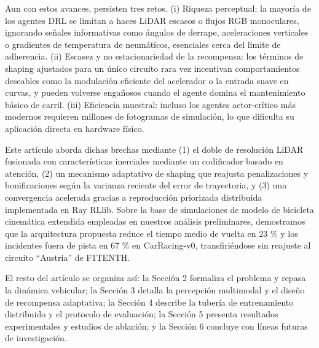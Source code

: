 Aun con estos avances, persisten tres retos. (i) Riqueza perceptual: la mayoría de los agentes DRL se limitan a haces LiDAR escasos o flujos RGB monoculares, ignorando señales informativas como ángulos de derrape, aceleraciones verticales o gradientes de temperatura de neumáticos, esenciales cerca del límite de adherencia. (ii) Escasez y no estacionariedad de la recompensa: los términos de shaping ajustados para un único circuito rara vez incentivan comportamientos deseables como la modulación eficiente del acelerador o la entrada suave en curvas, y pueden volverse engañosos cuando el agente domina el mantenimiento básico de carril. (iii) Eficiencia muestral: incluso los agentes actor-crítico más modernos requieren millones de fotogramas de simulación, lo que dificulta su aplicación directa en hardware físico.

Este artículo aborda dichas brechas mediante (1) el doble de resolución LiDAR fusionada con características inerciales mediante un codificador basado en atención, (2) un mecanismo adaptativo de shaping que reajusta penalizaciones y bonificaciones según la varianza reciente del error de trayectoria, y (3) una convergencia acelerada gracias a reproducción priorizada distribuida implementada en Ray RLlib. Sobre la base de simulaciones de modelo de bicicleta cinemática extendida empleadas en nuestros análisis preliminares, demostramos que la arquitectura propuesta reduce el tiempo medio de vuelta en 23 \% y los incidentes fuera de pista en 67 \% en CarRacing-v0, transfiriéndose sin reajuste al circuito “Austria” de F1TENTH.

El resto del artículo se organiza así: la Sección 2 formaliza el problema y repasa la dinámica vehicular; la Sección 3 detalla la percepción multimodal y el diseño de recompensa adaptativa; la Sección 4 describe la tubería de entrenamiento distribuido y el protocolo de evaluación; la Sección 5 presenta resultados experimentales y estudios de ablación; y la Sección 6 concluye con líneas futuras de investigación.

